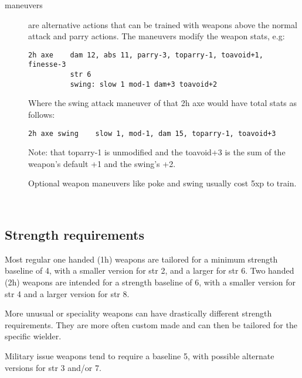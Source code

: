 \begin{description}
\item[maneuvers] are alternative actions that can be trained with weapons above the normal attack and parry actions. The maneuvers modify the weapon stats, e.g:
\begin{verbatim}
2h axe    dam 12, abs 11, parry-3, toparry-1, toavoid+1, finesse-3
          str 6
          swing: slow 1 mod-1 dam+3 toavoid+2
\end{verbatim}
Where the swing attack maneuver of that 2h axe would have total stats as follows:
\begin{verbatim}
2h axe swing    slow 1, mod-1, dam 15, toparry-1, toavoid+3
\end{verbatim}
Note: that toparry-1 is unmodified and the toavoid+3 is the sum of the weapon's default +1 and the swing's +2.

Optional weapon maneuvers like poke and swing usually cost 5xp to train.

\end{description}

\

\subsection*{Strength requirements}
Most regular one handed (1h) weapons are tailored for a minimum strength baseline of 4, with a smaller version for str 2, and a larger for str 6. Two handed (2h) weapons are intended for a strength baseline of 6, with a smaller version for str 4 and a larger version for str 8.

More unusual or speciality weapons can have drastically different strength requirements. They are more often custom made and can then be tailored for the specific wielder.

Military issue weapons tend to require a baseline 5, with possible alternate versions for str 3 and/or 7.


%



